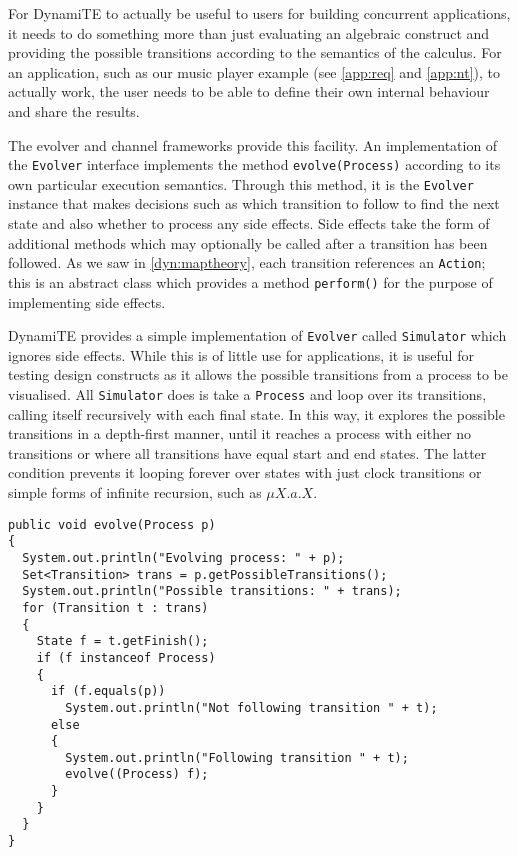 For DynamiTE to actually be useful to users for building concurrent
applications, it needs to do something more than just evaluating an
algebraic construct and providing the possible transitions according
to the semantics of the calculus.  For an application, such as our
music player example (see \ref{app:req} and \ref{app:nt}), to actually
work, the user needs to be able to define their own internal behaviour
and share the results.

The evolver and channel frameworks provide this facility.  An
implementation of the \texttt{Evolver} interface implements the method
\texttt{evolve(Process)} according to its own particular execution
semantics.  Through this method, it is the \texttt{Evolver} instance
that makes decisions such as which transition to follow to find the
next state and also whether to process any side effects.  Side effects
take the form of additional methods which may optionally be called
after a transition has been followed.  As we saw in
\ref{dyn:maptheory}, each transition references an \texttt{Action};
this is an abstract class which provides a method \texttt{perform()}
for the purpose of implementing side effects.

DynamiTE provides a simple implementation of \texttt{Evolver} called
\texttt{Simulator} which ignores side effects.  While this is of
little use for applications, it is useful for testing design
constructs as it allows the possible transitions from a process to be
visualised.  All \texttt{Simulator} does is take a \texttt{Process}
and loop over its transitions, calling itself recursively with each
final state.  In this way, it explores the possible transitions in a
depth-first manner, until it reaches a process with either no
transitions or where all transitions have equal start and end states.
The latter condition prevents it looping forever over states with just
clock transitions or simple forms of infinite recursion, such as $\mu
X.a.X$.

\begin{verbatim}
public void evolve(Process p)
{
  System.out.println("Evolving process: " + p);
  Set<Transition> trans = p.getPossibleTransitions();
  System.out.println("Possible transitions: " + trans);
  for (Transition t : trans)
  {
    State f = t.getFinish();
    if (f instanceof Process)
    {
      if (f.equals(p))
        System.out.println("Not following transition " + t);
      else
      {
        System.out.println("Following transition " + t);
        evolve((Process) f);
      }
    }
  }
}
\end{verbatim}

